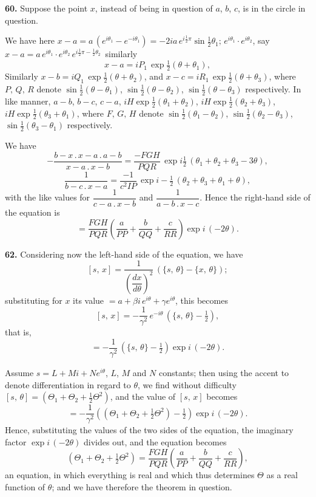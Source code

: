 \documentclass[11pt]{article}
\newcommand{\artno}[1]{\textbf{#1.}\quad}
\begin{document}
\artno{60} Suppose the point $x$, instead of being in question of $a$, $b$, $c$, is in
the circle in question.

We have here $x - a = a\,(e^{i\theta_{1}} - e^{-i\theta_{1}}) = -2i a\,e^{i\frac{1}{2}\pi}\sin\tfrac{1}{2}\theta_{1};\,e^{i\theta_{1}} \cdot e^{i\theta_{2}}$, say
$x - a = a\,e^{i\theta_{1}} \cdot e^{i\theta_{2}}\,e^{i\frac{1}{2}\pi - \frac{1}{2}\theta_{2}}\,$ similarly
\[
   x - a = i P_{1}\,\exp\tfrac{1}{2}(\theta + \theta_{1}),
\]
Similarly $x - b = i Q_{1}\,\exp\tfrac{1}{2}(\theta + \theta_{2})$, and $x - c = i R_{1}\,\exp\tfrac{1}{2}(\theta + \theta_{3})$, where $P,\, Q,\, R$ denote $\sin\tfrac{1}{2}(\theta - \theta_{1})$, $\sin\tfrac{1}{2}(\theta - \theta_{2})$, $\sin\tfrac{1}{2}(\theta - \theta_{3})$ respectively. In like manner, $a - b$, $b - c$, $c - a$, $iH\exp\tfrac{1}{2}(\theta_{1} + \theta_{2})$, $iH\exp\tfrac{1}{2}(\theta_{2} + \theta_{3})$, $iH\exp\tfrac{1}{2}(\theta_{3} + \theta_{1})$, where $F,\, G,\, H$ denote $\sin\tfrac{1}{2}(\theta_{1} - \theta_{2})$, $\sin\tfrac{1}{2}(\theta_{2} - \theta_{3})$, $\sin\tfrac{1}{2}(\theta_{3} - \theta_{1})$ respectively.

\newpage
We have
\[
   -\frac{b - x \,.\, x - a \,.\, a - b}{x - a \,.\, x - b} = \frac{-FGH}{PQR}\,\exp i\tfrac{1}{2}\,(\theta_{1} + \theta_{2} + \theta_{3} - 3\theta),
\]
\[
   \frac{1}{b - c \,.\, x - a} = \frac{-1}{c^{2}IP}\,\exp i - \tfrac{1}{2}\,(\theta_{2} + \theta_{3} + \theta_{1} + \theta),
\]
with the like values for $\dfrac{1}{c - a \,.\, x - b}$ and $\dfrac{1}{a - b \,.\, x - c}$. Hence the right-hand side of
the equation is
\[
   = \frac{FGH}{PQR}\!\left(\frac{a}{PP} + \frac{b}{QQ} + \frac{c}{RR}\right)\exp i\,(-2\theta).
\]

\artno{62} Considering now the left-hand side of the equation, we have
\[
   [s,\,x] = \frac{1}{\!\left(\dfrac{dx}{d\theta}\right)^{\!2}}\,(\{s,\,\theta\} - \{x,\,\theta\});
\]
substituting for $x$ its value $= a + \beta i\,e^{i\theta} + \gamma e^{i\theta}$, this becomes
\[
   [s,\,x] = -\frac{1}{\gamma^{2}}\,e^{-i\theta}\,(\{s,\,\theta\} - \tfrac{1}{2}),
\]
that is,
\[
   = -\frac{1}{\gamma^{2}}\,(\{s,\,\theta\} - \tfrac{1}{2})\exp i\,(-2\theta).
\]

Assume $s = L + Mi + Ne^{i\theta}$, $L$, $M$ and $N$ constants; then using the accent to denote
differentiation in regard to $\theta$, we find without difficulty $[s,\,\theta] = (\Theta_{1} + \Theta_{2} + \tfrac{1}{2}\Theta^{2})$, and the
value of $[s,\,x]$ becomes
\[
   = -\frac{1}{\gamma^{2}}\!\left((\Theta_{1} + \Theta_{2} + \tfrac{1}{2}\Theta^{2}) - \tfrac{1}{2}\right)\exp i\,(-2\theta).
\]
Hence, substituting the values of the two sides of the equation, the imaginary
factor $\exp i\,(-2\theta)$ divides out, and the equation becomes
\[
   (\Theta_{1} + \Theta_{2} + \tfrac{1}{2}\Theta^{2}) = \frac{FGH}{PQR}\!\left(\frac{a}{PP} + \frac{b}{QQ} + \frac{c}{RR}\right),
\]
an equation, in which everything is real and which thus determines $\Theta$ as a real
function of $\theta$; and we have therefore the theorem in question.
\end{document}
